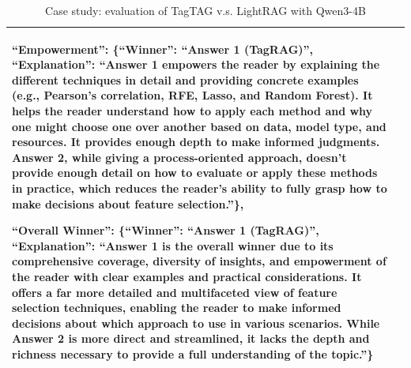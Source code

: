 \documentclass[11pt]{article}
\begin{document}
\begin{table}[h]
\begin{tabularx}{\textwidth}{p{2cm}|X}
    \textbf{``Empowerment''}: \{``Winner'': ``Answer 1 (TagRAG)'', ``Explanation'': ``Answer 1 empowers the reader by explaining the different techniques in detail and providing concrete examples (e.g., Pearson’s correlation, RFE, Lasso, and Random Forest). It helps the reader understand how to apply each method and why one might choose one over another based on data, model type, and resources. It provides enough depth to make informed judgments. Answer 2, while giving a process-oriented approach, doesn’t provide enough detail on how to evaluate or apply these methods in practice, which reduces the reader's ability to fully grasp how to make decisions about feature selection.''\},
    
    \textbf{``Overall Winner''}: \{``Winner'': ``Answer 1 (TagRAG)'', ``Explanation'': ``Answer 1 is the overall winner due to its comprehensive coverage, diversity of insights, and empowerment of the reader with clear examples and practical considerations. It offers a far more detailed and multifaceted view of feature selection techniques, enabling the reader to make informed decisions about which approach to use in various scenarios. While Answer 2 is more direct and streamlined, it lacks the depth and richness necessary to provide a full understanding of the topic.''\} \\

    \bottomrule
\end{tabularx}
\caption{Case study: evaluation of TagTAG v.s. LightRAG with Qwen3-4B}
\label{tab:TagTAG v.s. LightRAG}
\end{table}
\end{document}

